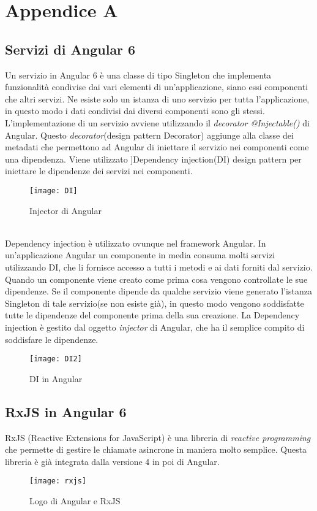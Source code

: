 
\chapter{Appendice A}
\section{Servizi di Angular 6}
 Un servizio in Angular 6 è una classe di tipo \gls{Singleton} che implementa funzionalità condivise dai vari elementi di un’applicazione, siano essi componenti che altri servizi.
Ne esiste solo un istanza di uno servizio per tutta l'applicazione, in questo modo i dati condivisi dai diversi componenti sono gli stessi.
\\

L'implementazione di un servizio avviene utilizzando il \emph{decorator @Injectable()} di Angular. Questo \emph{decorator}(design pattern \gls{Decorator}) aggiunge alla classe dei metadati che permettono ad Angular di iniettare il servizio nei componenti come una dipendenza. Viene utilizzato ]Dependency injection(\gls{DI}) design pattern per iniettare le dipendenze dei servizi nei componenti. 
\begin{figure}[!h] 
	\centering 
	\texttt{[image: DI]} 
	\caption{Injector di Angular}
\end{figure}
\\

Dependency injection è utilizzato ovunque nel framework Angular. In un'applicazione Angular un componente in media consuma molti servizi utilizzando DI, che li fornisce accesso a tutti i metodi e ai dati forniti dal servizio. 
\\ 

Quando un componente viene creato come prima cosa vengono controllate le sue dipendenze. Se il componente dipende da qualche servizio viene generato l'istanza Singleton di tale servizio(se non esiste già), in questo modo vengono soddisfatte tutte le dipendenze del componente prima della sua creazione. 
La Dependency injection è gestito dal oggetto \emph{injector} di Angular, che ha il semplice compito di soddisfare le dipendenze. 
\begin{figure}[!ht] 
	\centering 
	\texttt{[image: DI2]} 
	\caption{DI in Angular}
\end{figure}
\section{RxJS in Angular 6}
RxJS (Reactive Extensions for JavaScript) è una libreria di \emph{reactive programming} che permette di gestire le chiamate asincrone in maniera molto semplice. Questa libreria è già integrata dalla versione 4 in poi di Angular. 
\begin{figure}[!ht] 
	\centering 
	\texttt{[image: rxjs]} 
	\caption{Logo di Angular e RxJS}
\end{figure}

